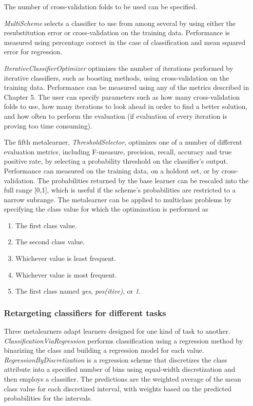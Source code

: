 The number of cross-validation folds to be used can be specified.

\textit{MultiScheme} selects a classifier to use from among several by
using either the resubstitution error or cross-validation on the
training data. Performance is measured using percentage correct in the
case of classification and mean squared error for regression.

\textit{IterativeClassifierOptimizer} optimizes the number of iterations
performed by iterative classifiers, such as boosting methods, using
cross-validation on the training data. Performance can be measured
using any of the metrics described in Chapter 5. The user can specify
parameters such as how many cross-validation folds to use, how many
iterations to look ahead in order to find a better solution, and how
often to perform the evaluation (if evaluation of every iteration is
proving too time consuming).

The fifth metalearner, \textit{ThresholdSelector}, optimizes one of a
number of different evaluation metrics, including F-measure,
precision, recall, accuracy and true positive rate, by selecting a
probability threshold on the classifier's output. Performance can
measured on the training data, on a holdout set, or by
cross-validation. The probabilities returned by the base learner can
be rescaled into the full range [0,1], which is useful if the scheme’s
probabilities are restricted to a narrow subrange. The metalearner can
be applied to multiclass problems by specifying the class value for
which the optimization is performed as

\begin{enumerate}
\item The first class value.
\item The second class value.
\item Whichever value is least frequent.
\item Whichever value is most frequent.
\item The first class named \textit{yes}, \textit{pos(itive)}, or \textit{1}.
\end{enumerate}

\subsubsection{Retargeting classifiers for different tasks}

Three metalearners adapt learners designed for one kind of task to
another. \textit{ClassificationViaRegression} performs classification
using a regression method by binarizing the class and building a
regression model for each value. \textit{RegressionByDiscretization}
is a regression scheme that discretizes the class attribute into a
specified number of bins using equal-width discretization and then
employs a classifier. The predictions are the weighted average of the
mean class value for each discretized interval, with weights based on
the predicted probabilities for the intervals.

